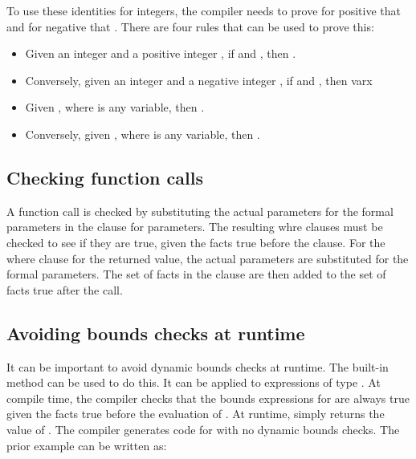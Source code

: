 To use these identities for integers, the compiler needs to prove for
positive  that  \code{+}   and for negative  that
  \code{+} .  There are four rules that can be used to prove this:

\begin{itemize}
\item
  Given an integer  and a positive integer , if 
   \code{<=}  and  \code{+}  ,
  then  \code{+}  .
\item
  Conversely, given an integer  and a negative integer 
  , if  \code{<=}  and  \code{+}
    , then var{x} \code{+}  
\item
  Given  \code{<} , where  is any variable, 
  then  .
\item
  Conversely, given  \code{>} , where 
  is any variable, then  .
\end{itemize}

\subsection{Checking function calls}

A function call is checked by substituting the actual parameters for the
formal parameters in the  clause for parameters.  The
resulting whre clauses must be checked to see if they are true, given
the facts true before the clause.  For the where clause for the returned
value, the actual parameters are substituted for the formal parameters.
The set of facts in the clause are then added to the set of facts true
after the call.

\subsection{Avoiding bounds checks at runtime}
\label{section:avoiding-bounds-checks}

It can be important to avoid dynamic bounds checks at runtime. The
built-in method  can be used to do this. It can be applied
to expressions of type \arrayptr. At compile time, the compiler
checks that the bounds expressions for  are always true given the
facts true before the evaluation of . At runtime, 
simply returns the value of . The compiler generates code for
\code{*} with no dynamic bounds checks. The prior example
can be written as:

